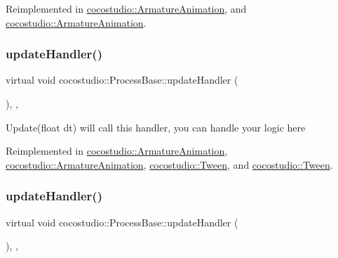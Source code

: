 Reimplemented in \hyperlink{classcocostudio_1_1ArmatureAnimation_a6ae1a77029ac2fe5663d2b997f54b245}{cocostudio\+::\+Armature\+Animation}, and \hyperlink{classcocostudio_1_1ArmatureAnimation_aec1d25a2b9221801e29782b05eb44f42}{cocostudio\+::\+Armature\+Animation}.

\mbox{\label{classcocostudio_1_1ProcessBase_adb15615e852617daf7a4f13b17bfc553}} 
\subsubsection{\texorpdfstring{update\+Handler()}{updateHandler()}\hspace{0.1cm}{\footnotesize\ttfamily [1/2]}}
{\footnotesize\ttfamily virtual void cocostudio\+::\+Process\+Base\+::update\+Handler (\begin{DoxyParamCaption}{ }\end{DoxyParamCaption})\hspace{0.3cm}{\ttfamily [inline]}, {\ttfamily [protected]}, {\ttfamily [virtual]}}

Update(float dt) will call this handler, you can handle your logic here 

Reimplemented in \hyperlink{classcocostudio_1_1ArmatureAnimation_ae2fd5441c69b5ac036116bbe548f5595}{cocostudio\+::\+Armature\+Animation}, \hyperlink{classcocostudio_1_1ArmatureAnimation_ae2fd5441c69b5ac036116bbe548f5595}{cocostudio\+::\+Armature\+Animation}, \hyperlink{classcocostudio_1_1Tween_ac595b653e11b8548f9ce599c0bc79f08}{cocostudio\+::\+Tween}, and \hyperlink{classcocostudio_1_1Tween_a35d383d868e393dc518c1197fc3a00ff}{cocostudio\+::\+Tween}.

\mbox{\label{classcocostudio_1_1ProcessBase_adb15615e852617daf7a4f13b17bfc553}} 
\subsubsection{\texorpdfstring{update\+Handler()}{updateHandler()}\hspace{0.1cm}{\footnotesize\ttfamily [2/2]}}
{\footnotesize\ttfamily virtual void cocostudio\+::\+Process\+Base\+::update\+Handler (\begin{DoxyParamCaption}{ }\end{DoxyParamCaption})\hspace{0.3cm}{\ttfamily [inline]}, {\ttfamily [protected]}, {\ttfamily [virtual]}}

